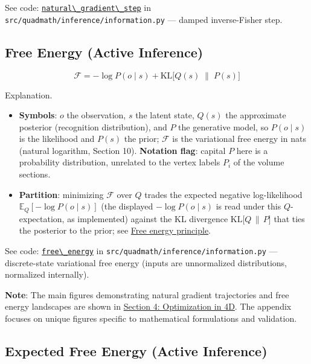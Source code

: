 \documentclass[
  10pt,
]{article}
\newcommand{\passthrough}[1]{#1}
\providecommand{\tightlist}{%
  \setlength{\itemsep}{0pt}\setlength{\parskip}{0pt}}
\begin{document}
See code:
\href{03_quadray_methods.md\#code:natural_gradient_step}{\passthrough{\lstinline!natural\_gradient\_step!}}
in \passthrough{\lstinline!src/quadmath/inference/information.py!} ---
damped inverse-Fisher step.

\subsection{Free Energy (Active Inference)}\label{eq:free_energy}

\begin{equation}\label{eq:free_energy}
\mathcal{F} = -\log P(o\mid s) + \mathrm{KL}\big[ Q(s)\;\|\; P(s) \big]
\end{equation}

Explanation.

\begin{itemize}
\tightlist
\item
  \textbf{Symbols}: \(o\) the observation, \(s\) the latent state,
  \(Q(s)\) the approximate posterior (recognition distribution), and
  \(P\) the generative model, so \(P(o \mid s)\) is the likelihood and
  \(P(s)\) the prior; \(\mathcal{F}\) is the variational free energy in
  nats (natural logarithm, Section 10). \textbf{Notation flag}: capital
  \(P\) here is a probability distribution, unrelated to the vertex
  labels \(P_i\) of the volume sections.
\item
  \textbf{Partition}: minimizing \(\mathcal{F}\) over \(Q\) trades the
  expected negative log-likelihood \(\mathbb{E}_Q[-\log P(o \mid s)]\)
  (the displayed \(-\log P(o\mid s)\) is read under this
  \(Q\)-expectation, as implemented) against the KL divergence
  \(\mathrm{KL}\big[Q\,\|\,P\big]\) that ties the posterior to the
  prior; see
  \href{https://en.wikipedia.org/wiki/Free_energy_principle}{Free energy
  principle}.
\end{itemize}

See code:
\href{03_quadray_methods.md\#code:free_energy}{\passthrough{\lstinline!free\_energy!}}
in \passthrough{\lstinline!src/quadmath/inference/information.py!} ---
discrete-state variational free energy (inputs are unnormalized
distributions, normalized internally).

\textbf{Note}: The main figures demonstrating natural gradient
trajectories and free energy landscapes are shown in
\href{04_optimization_in_4d.md}{Section 4: Optimization in 4D}. The
appendix focuses on unique figures specific to mathematical formulations
and validation.

\subsection{Expected Free Energy (Active
Inference)}\label{eq:expected_free_energy}
\end{document}
